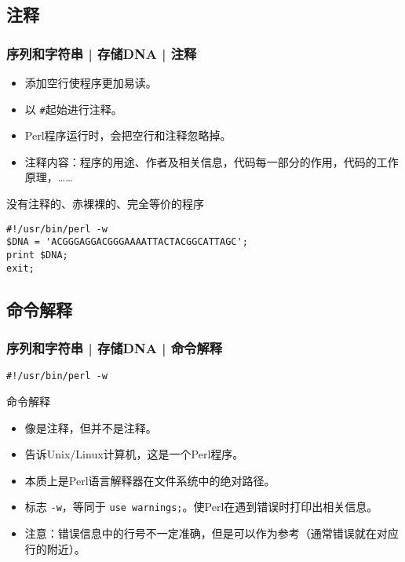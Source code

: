 \subsection{注释}
\begin{frame}[fragile]
  \frametitle{序列和字符串 | 存储DNA | 注释}
  \begin{itemize}
    \item 添加空行使程序更加易读。
    \item 以 \verb|#|起始进行注释。
    \item Perl程序运行时，会把空行和注释忽略掉。
    \item 注释内容：程序的用途、作者及相关信息，代码每一部分的作用，代码的工作原理，……
  \end{itemize}
  \pause
  \begin{block}{没有注释的、赤裸裸的、完全等价的程序}
  \vspace{-0.5em}
\begin{lstlisting}
#!/usr/bin/perl -w
$DNA = 'ACGGGAGGACGGGAAAATTACTACGGCATTAGC';
print $DNA;
exit;
\end{lstlisting}
  \end{block}
\end{frame}

\subsection{命令解释}
\begin{frame}[fragile]
  \frametitle{序列和字符串 | 存储DNA | \alert{命令解释}}
  \vspace{-1.5em}
\begin{lstlisting}
#!/usr/bin/perl -w
\end{lstlisting}
\pause
\begin{block}{命令解释}
  \begin{itemize}
    \item 像是注释，但并不是注释。
    \item 告诉Unix/Linux计算机，这是一个Perl程序。
    \item 本质上是Perl语言解释器在文件系统中的绝对路径。
    \item 标志 \verb|-w|，等同于 \verb|use warnings;|。使Perl在遇到错误时打印出相关信息。
    \item 注意：错误信息中的行号不一定准确，但是可以作为参考（通常错误就在对应行的附近）。
  \end{itemize}
\end{block}
\end{frame}

